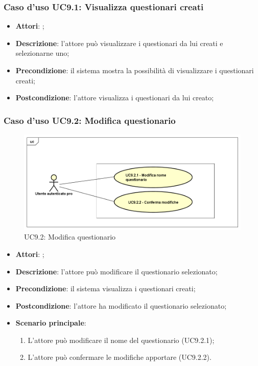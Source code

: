 	\subsubsection{Caso d'uso UC9.1: Visualizza questionari creati}
	\label{UC9.1}
	\begin{itemize}
		\item \textbf{Attori}: \uaupro{};
		\item \textbf{Descrizione}: l'attore può visualizzare i questionari da lui creati e selezionarne uno;
		\item \textbf{Precondizione}: il sistema mostra la possibilità di visualizzare i questionari creati;
		\item \textbf{Postcondizione}: l'attore visualizza i questionari da lui creato;
	\end{itemize}
	
	\subsubsection{Caso d'uso UC9.2: Modifica questionario}
	\label{UC9.2}
	\begin{figure}[h]
		\centering
	\includegraphics[scale=0.5,keepaspectratio]{UML/UC9_2.png}
		\caption{UC9.2: Modifica questionario}
	\end{figure}
	\FloatBarrier
	\begin{itemize}
		\item \textbf{Attori}: \uaupro{};
		\item \textbf{Descrizione}: l'attore può modificare il questionario selezionato;
		\item \textbf{Precondizione}: il sistema visualizza i questionari creati;
		\item \textbf{Postcondizione}: l'attore ha modificato il questionario selezionato; 
		\item \textbf{Scenario principale}:
			\begin{enumerate}
				\item L'attore può modificare il nome del questionario (UC9.2.1);
				\item L'attore può confermare le modifiche apportare (UC9.2.2).
			\end{enumerate}
	\end{itemize}
						
